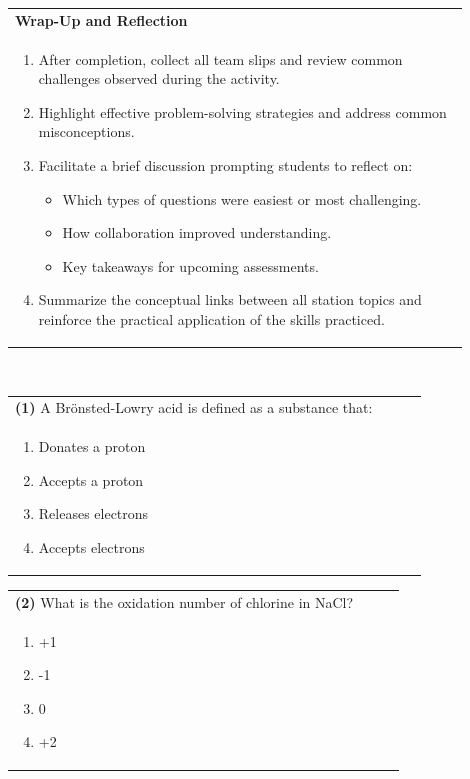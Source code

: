 \documentclass{article}
\begin{document}
\vspace{0.5cm}
\noindent
\begin{tabular}{|p{0.9\linewidth}|}
\hline
{\large\textbf{Wrap-Up and Reflection}} \\
\begin{enumerate}
    \item After completion, collect all team slips and review common challenges observed during the activity.
    \item Highlight effective problem-solving strategies and address common misconceptions.
    \item Facilitate a brief discussion prompting students to reflect on:
    \begin{itemize}
        \item Which types of questions were easiest or most challenging.
        \item How collaboration improved understanding.
        \item Key takeaways for upcoming assessments.
    \end{itemize}
    \item Summarize the conceptual links between all station topics and reinforce the practical application of the skills practiced.
\end{enumerate} \\
\hline
\end{tabular}
\newpage
{}\\[0.2em]
\vspace{0.2cm}

\noindent\begin{tabular}{|p{0.9\linewidth}|}
\hline
\textbf{(1)} A Brönsted-Lowry acid is defined as a substance that: \\[0.2cm]
\begin{minipage}[t]{0.85\linewidth}
\begin{enumerate}[label=\alph*.]
\item Donates a proton
\item Accepts a proton
\item Releases electrons
\item Accepts electrons
\end{enumerate}
\end{minipage}\\[0.2cm]
\hline
\end{tabular}

\noindent\begin{tabular}{|p{0.9\linewidth}|}
\hline
\textbf{(2)} What is the oxidation number of chlorine in NaCl?\\[0.2cm]
\begin{minipage}[t]{0.85\linewidth}
\begin{enumerate}[label=\alph*.]
\item +1
\item -1
\item 0
\item +2
\end{enumerate}
\end{minipage}\\[0.2cm]
\hline
\end{tabular}
\end{document}
